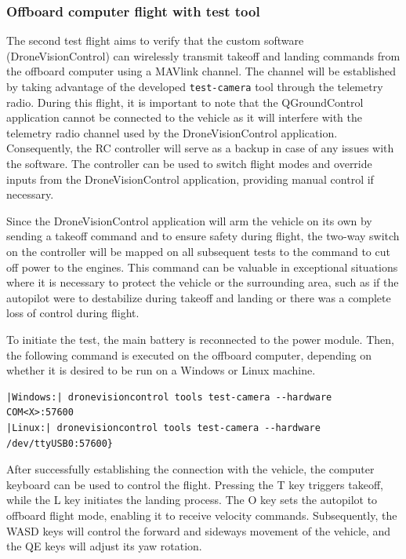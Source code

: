 \subsubsection{Offboard computer flight with test tool}
\label{subsec:fl-test-2}

The second test flight aims to verify that the custom software (DroneVisionControl) can wirelessly transmit takeoff and landing commands from the offboard computer using a MAVlink channel. The channel will be established by taking advantage of the developed \texttt{test-camera} tool through the telemetry radio. During this flight, it is important to note that the QGroundControl application cannot be connected to the vehicle as it will interfere with the telemetry radio channel used by the DroneVisionControl application. Consequently, the RC controller will serve as a backup in case of any issues with the software. The controller can be used to switch flight modes and override inputs from the DroneVisionControl application, providing manual control if necessary.

Since the DroneVisionControl application will arm the vehicle on its own by sending a takeoff command and to ensure safety during flight, the two-way switch on the controller will be mapped on all subsequent tests to the command to cut off power to the engines. This command can be valuable in exceptional situations where it is necessary to protect the vehicle or the surrounding area, such as if the autopilot were to destabilize during takeoff and landing or there was a complete loss of control during flight.

To initiate the test, the main battery is reconnected to the power module. Then, the following command is executed on the offboard computer, depending on whether it is desired to be run on a Windows or Linux machine.


\begin{verbatim}
|Windows:| dronevisioncontrol tools test-camera --hardware COM<X>:57600
|Linux:| dronevisioncontrol tools test-camera --hardware /dev/ttyUSB0:57600}
\end{verbatim}


After successfully establishing the connection with the vehicle, the computer keyboard can be used to control the flight. Pressing the T key triggers takeoff, while the L key initiates the landing process. The O key sets the autopilot to offboard flight mode, enabling it to receive velocity commands. Subsequently, the WASD keys will control the forward and sideways movement of the vehicle, and the QE keys will adjust its yaw rotation.

